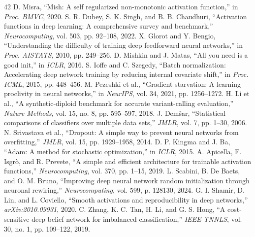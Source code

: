 \documentclass[10pt,a4paper]{article}
\begin{document}
\begin{thebibliography}{42}
 D. Misra, ``Mish: A self regularized non-monotonic activation function,'' in \textit{Proc. BMVC}, 2020.
 S. R. Dubey, S. K. Singh, and B. B. Chaudhuri, ``Activation functions in deep learning: A comprehensive survey and benchmark,'' \textit{Neurocomputing}, vol. 503, pp. 92--108, 2022.
 X. Glorot and Y. Bengio, ``Understanding the difficulty of training deep feedforward neural networks,'' in \textit{Proc. AISTATS}, 2010, pp. 249--256.
 D. Mishkin and J. Matas, ``All you need is a good init,'' in \textit{ICLR}, 2016.
 S. Ioffe and C. Szegedy, ``Batch normalization: Accelerating deep network training by reducing internal covariate shift,'' in \textit{Proc. ICML}, 2015, pp. 448--456.
 M. Pezeshki et al., ``Gradient starvation: A learning proclivity in neural networks,'' in \textit{NeurIPS}, vol. 34, 2021, pp. 1256--1272.
 H. Li et al., ``A synthetic-diploid benchmark for accurate variant-calling evaluation,'' \textit{Nature Methods}, vol. 15, no. 8, pp. 595--597, 2018.
 J. Dem\v{s}ar, ``Statistical comparisons of classifiers over multiple data sets,'' \textit{JMLR}, vol. 7, pp. 1--30, 2006.
 N. Srivastava et al., ``Dropout: A simple way to prevent neural networks from overfitting,'' \textit{JMLR}, vol. 15, pp. 1929--1958, 2014.
 D. P. Kingma and J. Ba, ``Adam: A method for stochastic optimization,'' in \textit{ICLR}, 2015.
 A. Apicella, F. Isgr\`{o}, and R. Prevete, ``A simple and efficient architecture for trainable activation functions,'' \textit{Neurocomputing}, vol. 370, pp. 1--15, 2019.
 L. Scabini, B. De Baets, and O. M. Bruno, ``Improving deep neural network random initialization through neuronal rewiring,'' \textit{Neurocomputing}, vol. 599, p. 128130, 2024.
 G. I. Shamir, D. Lin, and L. Coviello, ``Smooth activations and reproducibility in deep networks,'' \textit{arXiv:2010.09931}, 2020.
 C. Zhang, K. C. Tan, H. Li, and G. S. Hong, ``A cost-sensitive deep belief network for imbalanced classification,'' \textit{IEEE TNNLS}, vol. 30, no. 1, pp. 109--122, 2019.
\end{thebibliography}
\end{document}
